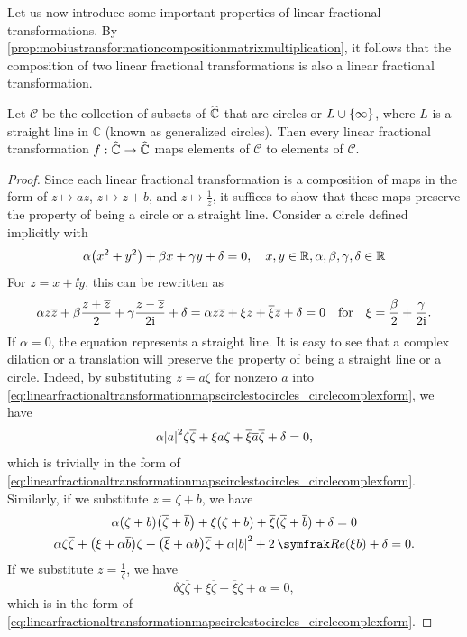 Let us now introduce some important properties of linear fractional transformations. By \cref{prop:mobiustransformationcompositionmatrixmultiplication}, it follows that the composition of two linear fractional transformations is also a linear fractional transformation.
\begin{theorem}\label{thm:linearfractionaltransformationmapscirclestocircles}
    Let \(\mathcal{C}\) be the collection of subsets of \(\widehat{\mathbb{C}}\) that are circles or \(L\cup\cbraces{\infty}\), where \(L\) is a straight line in \(\mathbb{C}\) (known as generalized circles). Then every linear fractional transformation \(f:\widehat{\mathbb{C}}\to\widehat{\mathbb{C}}\) maps elements of \(\mathcal{C}\) to elements of \(\mathcal{C}\).
\end{theorem}
\begin{proof}
    Since each linear fractional transformation is a composition of maps in the form of \(z\mapsto az\), \(z\mapsto z+b\), and \(\textstyle z\mapsto\frac{1}{z}\), it suffices to show that these maps preserve the property of being a circle or a straight line. Consider a circle defined implicitly with \[\alpha\qty(x^2+y^2)+\beta x+\gamma y+\delta=0,\quad{x,y\in\mathbb{R},\alpha,\beta,\gamma,\delta\in\mathbb{R}}\] For \(z=x+\ii y\), this can be rewritten as
    \begin{equation}
        \alpha z\overline{z}+\beta\frac{z+\overline{z}}{2}+\gamma\frac{z-\overline{z}}{2\ii}+\delta=\alpha z\overline{z}+\xi z+\overline{\xi}\overline{z}+\delta=0\qfor\xi=\frac{\beta}{2}+\frac{\gamma}{2\ii}.\label{eq:linearfractionaltransformationmapscirclestocircles_circlecomplexform}
    \end{equation}
    If \(\alpha=0\), the equation represents a straight line. It is easy to see that a complex dilation or a translation will preserve the property of being a straight line or a circle. Indeed, by substituting \(z=a\zeta\) for nonzero \(a\) into \cref{eq:linearfractionaltransformationmapscirclestocircles_circlecomplexform}, we have
    \[\alpha \abs{a}^2\zeta\overline{\zeta}+\xi a\zeta+\overline{\xi} \overline{a}\overline{\zeta}+\delta=0,\] which is trivially in the form of \cref{eq:linearfractionaltransformationmapscirclestocircles_circlecomplexform}. Similarly, if we substitute \(z=\zeta+b\), we have
    \begin{gather*}
        \alpha(\zeta+b)\qty(\overline{\zeta}+\overline{b})+\xi(\zeta+b)+\overline{\xi}(\overline{\zeta}+\overline{b})+\delta=0\\
        \alpha\zeta\overline{\zeta}+\qty(\xi+\alpha\overline{b})\zeta+\qty(\overline{\xi}+\alpha b)\overline{\zeta}+\alpha\abs{b}^2+2\Re(\xi b)+\delta=0.
    \end{gather*}
    If we substitute \(z=\frac{1}{\zeta}\), we have \[\delta\zeta\overline{\zeta}+\xi\overline{\zeta}+\overline{\xi}\zeta+\alpha=0,\]
    which is in the form of \cref{eq:linearfractionaltransformationmapscirclestocircles_circlecomplexform}.
\end{proof}
